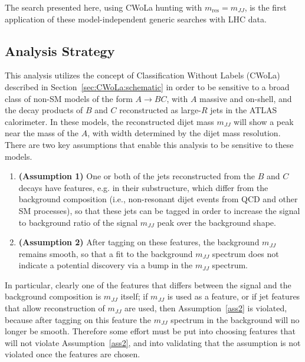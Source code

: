 The search presented here, using CWoLa hunting with $m_\text{res}=m_{JJ}$, is the first application of these model-independent generic searches with LHC data.

\FloatBarrier
\subsection{Analysis Strategy}
\label{sec:CWoLa:Analysis:Overview}
This analysis utilizes the concept of Classification Without Labels (CWoLa) described in Section~\ref{sec:CWoLa:schematic} in order to be sensitive to a broad class of non-SM models of the form $A\rightarrow BC$, with $A$ massive and on-shell, and the decay products of $B$ and $C$ reconstructed as large-$R$ jets in the ATLAS calorimeter.
In these models, the reconstructed dijet mass $m_{JJ}$ will show a peak near the mass of the $A$, with width determined by the dijet mass resolution.
There are two key assumptions that enable this analysis to be sensitive to these models.
\begin{enumerate}
  \item \textbf{(Assumption 1)} One or both of the jets reconstructed from the $B$ and $C$ decays have features, e.g. in their substructure, which differ from the background composition (i.e., non-resonant dijet events from QCD and other SM processes), so that these jets can be tagged in order to increase the signal to background ratio of the signal $m_{JJ}$ peak over the background shape. \label{ass1}
  \item \textbf{(Assumption 2)} After tagging on these features, the background $m_{JJ}$ remains smooth, so that a fit to the background $m_{JJ}$ spectrum does not indicate a potential discovery via a bump in the $m_{JJ}$ spectrum. \label{ass2}
\end{enumerate}
In particular, clearly one of the features that differs between the signal and the background composition is $m_{JJ}$ itself; if $m_{JJ}$ is used as a feature, or if jet features that allow reconstruction of $m_{JJ}$ are used, then Assumption~\ref{ass2} is violated, because after tagging on this feature the $m_{JJ}$ spectrum in the background will no longer be smooth.
Therefore some effort must be put into choosing features that will not violate Assumption~\ref{ass2}, and into validating that the assumption is not violated once the features are chosen.

